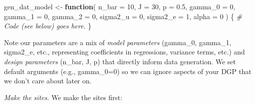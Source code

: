 \documentclass[
]{book}
\newenvironment{Shaded}{\begin{snugshade}}{\end{snugshade}}
\newcommand{\AttributeTok}[1]{\textcolor[rgb]{0.77,0.63,0.00}{#1}}
\newcommand{\CommentTok}[1]{\textcolor[rgb]{0.56,0.35,0.01}{\textit{#1}}}
\newcommand{\ControlFlowTok}[1]{\textcolor[rgb]{0.13,0.29,0.53}{\textbf{#1}}}
\newcommand{\DecValTok}[1]{\textcolor[rgb]{0.00,0.00,0.81}{#1}}
\newcommand{\FloatTok}[1]{\textcolor[rgb]{0.00,0.00,0.81}{#1}}
\newcommand{\NormalTok}[1]{#1}
\newcommand{\OtherTok}[1]{\textcolor[rgb]{0.56,0.35,0.01}{#1}}
\begin{document}
\begin{Shaded}
\begin{Highlighting}[]
\NormalTok{gen\_dat\_model }\OtherTok{\textless{}{-}} \ControlFlowTok{function}\NormalTok{( }\AttributeTok{n\_bar =} \DecValTok{10}\NormalTok{,}
                           \AttributeTok{J =} \DecValTok{30}\NormalTok{,}
                           \AttributeTok{p =} \FloatTok{0.5}\NormalTok{,}
                           \AttributeTok{gamma\_0 =} \DecValTok{0}\NormalTok{, }\AttributeTok{gamma\_1 =} \DecValTok{0}\NormalTok{, }\AttributeTok{gamma\_2 =} \DecValTok{0}\NormalTok{,}
                           \AttributeTok{sigma2\_u =} \DecValTok{0}\NormalTok{, }\AttributeTok{sigma2\_e =} \DecValTok{1}\NormalTok{,}
                           \AttributeTok{alpha =} \DecValTok{0}\NormalTok{ ) \{}
  \CommentTok{\# Code (see below) goes here.}
\NormalTok{\}}
\end{Highlighting}
\end{Shaded}

Note our parameters are a mix of \emph{model parameters} (gamma\_0, gamma\_1, sigma2\_e, etc., representing coefficients in regressions, variance terms, etc.) and \emph{design parameters} (n\_bar, J, p) that directly inform data generation.
We set default arguments (e.g., gamma\_0=0) so we can ignore aspects of your DGP that we don't care about later on.

\emph{Make the sites.}
We make the sites first:
\end{document}
